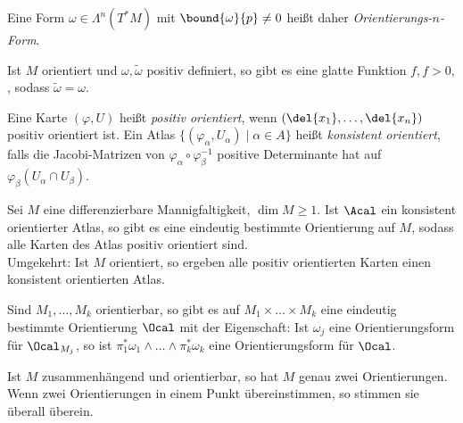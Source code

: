 \begin{rem*}
	Eine Form \( \omega \in \Lambda^n(T^*M)\) mit \( \bound{\omega}{p} \neq 0 \) heißt daher \emph{Orientierungs-$n$-Form}.
\end{rem*}

Ist $M$ orientiert und $\omega, \tilde{\omega}$ positiv definiert, so gibt es eine glatte Funktion \( f, f > 0, \), sodass \( \tilde{\omega} = \omega \).

\begin{defn*}
	Eine Karte \( (\varphi,U) \) heißt \emph{positiv orientiert}, wenn \( (\del{x_1}, \dotsc, \del{x_n}) \) positiv orientiert ist. Ein Atlas \( \{(\varphi_\alpha, U_\alpha) \mid \alpha \in A\} \) heißt \emph{konsistent orientiert}, falls die Jacobi-Matrizen von \( \varphi_\alpha \circ \varphi_\beta^{-1} \) positive Determinante hat auf \( \varphi_\beta(U_\alpha \cap U_\beta) \).
\end{defn*}

\begin{lem}
	Sei $M$ eine differenzierbare Mannigfaltigkeit, $\dim M \geq 1$. Ist $\Acal$ ein konsistent orientierter Atlas, so gibt es eine eindeutig bestimmte Orientierung auf $M$, sodass alle Karten des Atlas positiv orientiert sind.\\
	Umgekehrt: Ist $M$ orientiert, so ergeben alle positiv orientierten Karten einen konsistent orientierten Atlas.
\end{lem}

\begin{lem}
	Sind \( M_1, \dotsc, M_k \) orientierbar, so gibt es auf \( M_1 \times \dots \times M_k \) eine eindeutig bestimmte Orientierung $\Ocal$ mit der Eigenschaft: Ist $\omega_j$ eine Orientierungsform für $\Ocal_{M_j}$, so ist \( \pi_1^*\omega_1 \wedge \dots \wedge \pi_k^*\omega_k \) eine Orientierungsform für $\Ocal$.
\end{lem}

\begin{lem}
	Ist $M$ zusammenhängend und orientierbar, so hat $M$ genau zwei Orientierungen. Wenn zwei Orientierungen in einem Punkt übereinstimmen, so stimmen sie überall überein.
\end{lem}